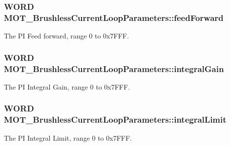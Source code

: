\subsubsection[{\texorpdfstring{feed\+Forward}{feedForward}}]{\setlength{\rightskip}{0pt plus 5cm}W\+O\+RD M\+O\+T\+\_\+\+Brushless\+Current\+Loop\+Parameters\+::feed\+Forward}\hypertarget{struct_m_o_t___brushless_current_loop_parameters_a4818f26588bda6bda4524189df13c82d}{}\label{struct_m_o_t___brushless_current_loop_parameters_a4818f26588bda6bda4524189df13c82d}


The PI Feed forward, range 0 to 0x7\+F\+FF. 

\subsubsection[{\texorpdfstring{integral\+Gain}{integralGain}}]{\setlength{\rightskip}{0pt plus 5cm}W\+O\+RD M\+O\+T\+\_\+\+Brushless\+Current\+Loop\+Parameters\+::integral\+Gain}\hypertarget{struct_m_o_t___brushless_current_loop_parameters_aee0a51f6021b8b48e9fd312f2ba9b356}{}\label{struct_m_o_t___brushless_current_loop_parameters_aee0a51f6021b8b48e9fd312f2ba9b356}


The PI Integral Gain, range 0 to 0x7\+F\+FF. 

\subsubsection[{\texorpdfstring{integral\+Limit}{integralLimit}}]{\setlength{\rightskip}{0pt plus 5cm}W\+O\+RD M\+O\+T\+\_\+\+Brushless\+Current\+Loop\+Parameters\+::integral\+Limit}\hypertarget{struct_m_o_t___brushless_current_loop_parameters_a224e0bd654a301050e9390c667b7fd9b}{}\label{struct_m_o_t___brushless_current_loop_parameters_a224e0bd654a301050e9390c667b7fd9b}


The PI Integral Limit, range 0 to 0x7\+F\+FF. 

